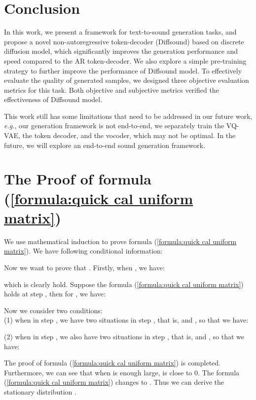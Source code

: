 \documentclass[lettersize,journal]{IEEEtran}
\begin{document}
\section{Conclusion} 
In this work, we present a framework for text-to-sound generation tasks, and propose a novel non-autoregressive token-decoder (Diffsound) based on discrete diffusion model, which significantly improves the generation performance and speed compared to the AR token-decoder. We also explore a simple pre-training strategy to further improve the performance of Diffsound model. To effectively evaluate the quality of generated samples, we designed three objective evaluation metrics for this task. Both objective and subjective metrics verified the effectiveness of Diffsound model.

This work still has some limitations that need to be
addressed in our future work, \textit{e.g.}, our generation framework is not end-to-end, we separately train the VQ-VAE, the token decoder, and the vocoder, which may not be optimal. In the future, we will explore an end-to-end sound generation framework.







\appendices
\section{The Proof of formula (\ref{formula:quick cal uniform matrix})} \label{appendix1}
We use mathematical induction to prove formula (\ref{formula:quick cal uniform matrix}). We have following conditional information:

Now we want to prove that .
Firstly, when , we have:

which is clearly hold. Suppose the formula (\ref{formula:quick cal uniform matrix}) holds at step , then for , we have:

Now we consider two conditions: \\
(1) when  in step , we have two situations in step , that is,  and , so that we have:

(2) when  in step , we also have two situations in step , that is,  and ,  so that we have:

The proof of formula (\ref{formula:quick cal uniform matrix}) is completed. \\
Furthermore, we can see that when  is enough large,  is close to 0. The formula (\ref{formula:quick cal uniform matrix}) changes to . Thus we can derive the stationary distribution .
\end{document}
